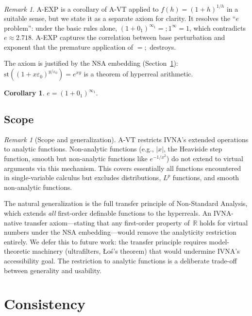 \documentclass[12pt]{article}
\newtheorem{corollary}[theorem]{Corollary}
\theoremstyle{definition}
\theoremstyle{remark}
\newtheorem{remark}[theorem]{Remark}
\newcommand{\vz}[1]{0_{#1}}             %
\newcommand{\vi}[1]{\infty_{#1}}        %
\newcommand{\ceq}{\mathrel{=\!\!;}}     %
\newcommand{\R}{\mathbb{R}}
\begin{document}
\begin{remark}
A-EXP is a corollary of A-VT applied to $f(h) = (1+h)^{1/h}$ in a suitable
sense, but we state it as a separate axiom for clarity. It resolves the
``$e$ problem'': under the basic rules alone,
$(1 + \vz{1})^{\vi{1}} \ceq 1^{\infty} = 1$, which contradicts $e \approx 2.718$.
A-EXP captures the correlation between base perturbation and exponent that the
premature application of $\ceq$ destroys.

The axiom is justified by the NSA embedding (Section~\ref{sec:consistency}):
$\mathrm{st}\!\left((1 + x\varepsilon_0)^{y/\varepsilon_0}\right) = e^{xy}$
is a theorem of hyperreal arithmetic.
\end{remark}

\begin{corollary}
$e = (1 + \vz{1})^{\vi{1}}$.
\end{corollary}

\subsection{Scope}

\begin{remark}[Scope and generalization]
A-VT restricts IVNA's extended operations to analytic functions. Non-analytic
functions (e.g., $|x|$, the Heaviside step function, smooth but non-analytic
functions like $e^{-1/x^2}$) do not extend to virtual arguments via this
mechanism. This covers essentially all functions encountered in single-variable
calculus but excludes distributions, $L^p$ functions, and smooth non-analytic
functions.

The natural generalization is the full transfer principle of
Non-Standard Analysis, which extends \emph{all} first-order
definable functions to the hyperreals. An IVNA-native transfer
axiom---stating that any first-order property of~$\R$ holds for
virtual numbers under the NSA embedding---would remove the
analyticity restriction entirely. We defer this to future work:
the transfer principle requires model-theoretic machinery
(ultrafilters, {\L}o\'s's theorem) that would undermine IVNA's
accessibility goal. The restriction to analytic functions is a
deliberate trade-off between generality and usability.
\end{remark}


\section{Consistency}
\label{sec:consistency}
\end{document}
